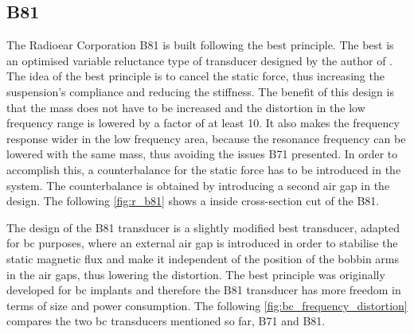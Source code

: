 



\subsection{B81}
The Radioear Corporation B81 is built following the \gls{best} principle. The \gls{best} is an optimised variable reluctance type of transducer designed by the author of \citep{the_balanced_2003}. The idea of the \gls{best} principle is to cancel the static force, thus increasing the suspension's compliance and reducing the stiffness. The benefit of this design is that the mass does not have to be increased and the distortion in the low frequency range is lowered by a factor of at least 10. It also makes the frequency response wider in the low frequency area, because the resonance frequency can be lowered with the same mass, thus avoiding the issues B71 presented. In order to accomplish this, a counterbalance for the static force has to be introduced in the system. The counterbalance is obtained by introducing a second air gap in the design. The following \autoref{fig:r_b81} shows a inside cross-section cut of the B81.



The design of the B81 transducer is a slightly modified \gls{best} transducer, adapted for \gls{bc} purposes, where an external air gap is introduced in order to stabilise the static magnetic flux and make it independent of the position of the bobbin arms in the air gaps, thus lowering the distortion.  The \gls{best} principle was originally developed for \gls{bc} implants and therefore the B81 transducer has more freedom in terms of size and power consumption. The following \autoref{fig:bc_frequency_distortion} compares the two \gls{bc} transducers mentioned so far, B71 and B81.


